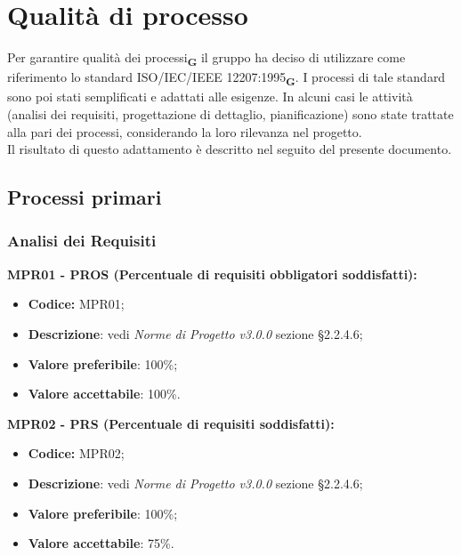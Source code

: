 \section{Qualità di processo}
Per garantire qualità dei processi\textsubscript{\textbf{G}} il gruppo ha deciso di utilizzare come riferimento lo standard ISO/IEC/IEEE 12207:1995\textsubscript{\textbf{G}}.
I processi di tale standard sono poi stati semplificati e adattati alle esigenze.
In alcuni casi le attività (analisi dei requisiti, progettazione di dettaglio, pianificazione) sono state trattate alla pari dei processi, considerando la loro rilevanza nel progetto.\\Il risultato di questo adattamento è descritto nel seguito del presente documento.
\subsection{Processi primari}
\subsubsection{Analisi dei Requisiti}
\textbf{MPR01 - PROS (Percentuale di requisiti obbligatori soddisfatti):}
\begin{itemize}
    \item \textbf{Codice:} MPR01;
    \item \textbf{Descrizione}: vedi \textit{Norme di Progetto v3.0.0} sezione \S 2.2.4.6;
    \item \textbf{Valore preferibile}: 100\%;
    \item \textbf{Valore accettabile}: 100\%.
\end{itemize}
\textbf{MPR02 - PRS (Percentuale di requisiti soddisfatti):}
\begin{itemize}
    \item \textbf{Codice:} MPR02;
    \item \textbf{Descrizione}: vedi \textit{Norme di Progetto v3.0.0} sezione \S 2.2.4.6;
    \item \textbf{Valore preferibile}: 100\%;
    \item \textbf{Valore accettabile}: 75\%.
\end{itemize}
